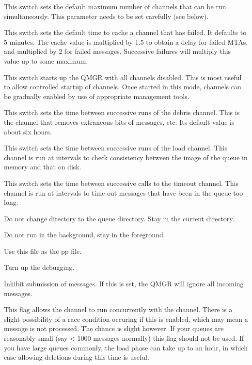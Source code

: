 \begin{describe}
\item[\verb|-m|:] This switch sets the default maximum number of
channels that can be run simultaneously. This parameter needs to be set
carefully (see below).

\item[\verb|-c seconds|:] This switch sets the default time to cache a
channel that has failed. It defaults to 5 minutes. The cache value is
multiplied by 1.5 to obtain a delay for failed MTAs, and multiplied by
2 for failed messages. Successive failures will multiply this value up
to some maximum.

\item[\verb|-D|:] This switch starts up the QMGR with all channels
disabled. This is most useful to allow controlled startup of
channels. Once started in this mode, channels can be gradually enabled
by use of appropriate management tools.

\item[\verb|-d hours|:] This switch sets the time between successive
runs of the debris channel. This is the channel that removes
extraneous bits of messages, etc. Its default value is about six hours.

\item[\verb|-l hours|:] This switch sets the time between successive
runs of the load channel. This channel is run at intervals to check
consistency between the image of the queue in memory and that on disk.

\item[\verb|-t hours|:] This switch sets the time between successive
calls to the timeout channel. This channel is run at intervals to time
out messages that have been in the queue too long.

\item[\verb|-C|:] Do not change directory to the queue directory. Stay
in the current directory.

\item[\verb|-b|:] Do not run in the background, stay in the foreground.

\item[\verb|-T file|:] Use this file as the pp  file.

\item[\verb|-X|:] Turn up the debugging.

\item[\verb|-s|:] Inhibit submission of messages. If this is set, the
QMGR will ignore all incoming messages.

\item[\verb|-M|:] This flag allows the  channel to run
concurrently with the  channel. There is a slight
possibility of a race condition occuring if this is enabled, which
may mean a message is not processed. The chance is slight however. If
your queues are reasonably small (say < 1000 messages normally) this
flag should not be used. If you have large queues commonly, the load
phase can take up to an hour, in which case allowing deletions during
this time is useful.
\end{describe}


